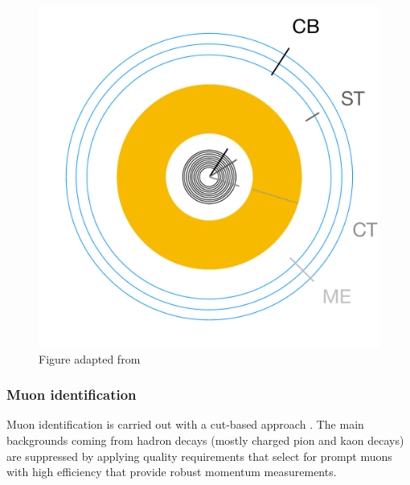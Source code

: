 \begin{figure}
    \centering
    \includegraphics[width=\smallfigwidth]{Figures/LHC/muon_types.pdf}
    \caption{Figure adapted from \cite{Ottersbach:2012mma}}
    \label{fig:typesofmuons}
\end{figure}

\subsubsection{Muon identification}

Muon identification is carried out with a cut-based approach \cite{}. The main backgrounds coming from hadron decays (mostly charged pion and kaon decays) are suppressed by applying quality requirements that select for prompt muons with high efficiency that provide robust momentum measurements. 

